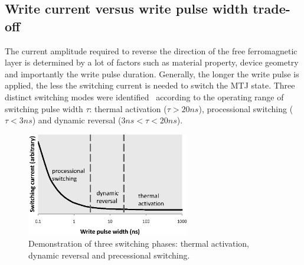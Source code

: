 \subsection{Write current versus write pulse width trade-off} \label{subsec:ict}
The current amplitude required to reverse the direction of the free ferromagnetic layer is determined by a lot of factors such as material property, device geometry and importantly the write pulse duration. Generally, the longer the write pulse is applied, the less the switching current is needed to switch the MTJ state. Three distinct switching modes were identified~\cite{STTRAM:JAP07} according to the operating range of switching pulse width $\tau$: thermal activation ($\tau>20ns$), processional switching ($\tau<3ns$) and dynamic reversal ($3ns<\tau<20ns$).

\begin{figure}[t]
  \centering
  \includegraphics[width=2.8in]{fig/IcWt.eps}
  \caption{Demonstration of three switching phases: thermal activation, dynamic reversal and precessional switching.}
  \label{fig:IcWt}
\vspace{-15pt}
\end{figure}

